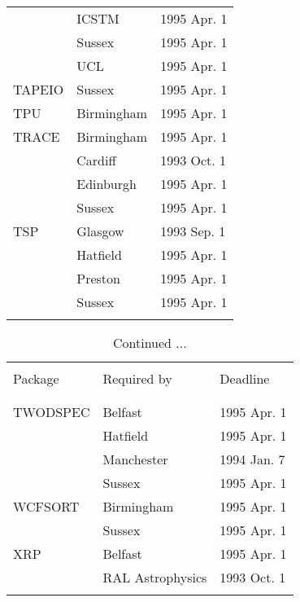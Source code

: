 \begin{table}
\begin{center}
\begin{tabular}{|p{36mm}|p{50mm}|p{30mm}|}
                        & ICSTM            & 1995 Apr. 1 \\
                        & Sussex           & 1995 Apr. 1 \\
                        & UCL              & 1995 Apr. 1 \\
TAPEIO                  & Sussex           & 1995 Apr. 1 \\
TPU                     & Birmingham       & 1995 Apr. 1 \\
TRACE                   & Birmingham       & 1995 Apr. 1 \\
                        & Cardiff          & 1993 Oct. 1 \\
                        & Edinburgh        & 1995 Apr. 1 \\
                        & Sussex           & 1995 Apr. 1 \\
TSP                     & Glasgow          & 1993 Sep. 1 \\
                        & Hatfield         & 1995 Apr. 1 \\
                        & Preston          & 1995 Apr. 1 \\
                        & Sussex           & 1995 Apr. 1 \\
& & \\ \hline                   
\end{tabular}
\end{center}
\end{table}


\addtocounter{table}{-1}
\begin{table}
\caption{Continued ...}
\vspace{5mm}
\begin{center}
\begin{tabular}{|p{36mm}|p{50mm}|p{30mm}|} \hline
& & \\
Package & Required by & Deadline \\
& & \\ \hline
& & \\
TWODSPEC                & Belfast          & 1995 Apr. 1 \\
                        & Hatfield         & 1995 Apr. 1 \\
                        & Manchester       & 1994 Jan. 7 \\
                        & Sussex           & 1995 Apr. 1 \\
WCFSORT                 & Birmingham       & 1995 Apr. 1 \\
                        & Sussex           & 1995 Apr. 1 \\
XRP                     & Belfast          & 1995 Apr. 1 \\
                        & RAL Astrophysics & 1993 Oct. 1 \\
& & \\ \hline                   
\end{tabular}
\end{center}
\end{table}



